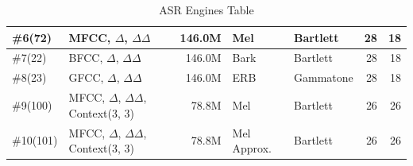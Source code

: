 \begin{table}[H]
\begin{tabular}{ !{\color{ytblborder}\vrule}l!{\color{ytblborder}\vrule}lrllrr| }
    \hline
      \#6(72)  
        & MFCC, \(\Delta\), \(\Delta\Delta\) 
        & 146.0M
        & Mel 
        & Bartlett
        & 28 
        & 18 \\
    \hline

    \hline
      \#7(22)  
        & BFCC, \(\Delta\), \(\Delta\Delta\) 
        & 146.0M
        & Bark 
        & Bartlett
        & 28 
        & 18 \\
    \hline

    \hline
      \#8(23)  
        & GFCC, \(\Delta\), \(\Delta\Delta\) 
        & 146.0M
        & ERB
        & Gammatone
        & 28 
        & 18 \\
    \hline

    \hline
      \#9(100)  
        & MFCC, \(\Delta\), \(\Delta\Delta\), Context(3, 3)
        & 78.8M
        & Mel 
        & Bartlett
        & 26 
        & 26 \\
    \hline

    \hline
      \#10(101)
        & MFCC, \(\Delta\), \(\Delta\Delta\), Context(3, 3)
        & 78.8M
        & Mel Approx.
        & Bartlett
        & 26 
        & 26 \\
    \hline

    \hline
\end{tabular}
\caption{ASR Engines Table}
\label{tbl:asr_engines}
\end{table}















